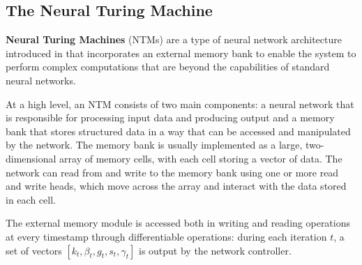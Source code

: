 \documentclass{article}
\begin{document}
\subsection{The Neural Turing Machine}

\textbf{Neural Turing Machines} (NTMs) are a type of neural network architecture introduced in \cite{GRA14} that incorporates an external memory bank to enable the system to perform complex computations that are beyond the capabilities of standard neural networks.

At a high level, an NTM consists of two main components: a neural network that is responsible for processing input data and producing output and a memory bank that stores structured data in a way that can be accessed and manipulated by the network. The memory bank is usually implemented as a large, two-dimensional array of memory cells, with each cell storing a vector of data. The network can read from and write to the memory bank using one or more read and write heads, which move across the array and interact with the data stored in each cell.

The external memory module is accessed both in writing and reading operations at every timestamp through differentiable operations: during each iteration $t$, a set of vectors $[k_t, \beta_t, g_t, s_t, \gamma_t]$ is output by the network controller.
\end{document}
